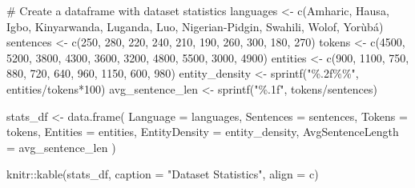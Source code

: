 \documentclass[
]{article}
\newenvironment{Shaded}{\begin{snugshade}}{\end{snugshade}}
\newcommand{\AttributeTok}[1]{\textcolor[rgb]{0.40,0.45,0.13}{#1}}
\newcommand{\CommentTok}[1]{\textcolor[rgb]{0.37,0.37,0.37}{#1}}
\newcommand{\DecValTok}[1]{\textcolor[rgb]{0.68,0.00,0.00}{#1}}
\newcommand{\FunctionTok}[1]{\textcolor[rgb]{0.28,0.35,0.67}{#1}}
\newcommand{\NormalTok}[1]{\textcolor[rgb]{0.00,0.23,0.31}{#1}}
\newcommand{\OtherTok}[1]{\textcolor[rgb]{0.00,0.23,0.31}{#1}}
\newcommand{\SpecialCharTok}[1]{\textcolor[rgb]{0.37,0.37,0.37}{#1}}
\newcommand{\StringTok}[1]{\textcolor[rgb]{0.13,0.47,0.30}{#1}}
\begin{document}
\begin{Shaded}
\begin{Highlighting}[]
\CommentTok{\# Create a dataframe with dataset statistics}
\NormalTok{languages }\OtherTok{\textless{}{-}} \FunctionTok{c}\NormalTok{(}\StringTok{\textquotesingle{}Amharic\textquotesingle{}}\NormalTok{, }\StringTok{\textquotesingle{}Hausa\textquotesingle{}}\NormalTok{, }\StringTok{\textquotesingle{}Igbo\textquotesingle{}}\NormalTok{, }\StringTok{\textquotesingle{}Kinyarwanda\textquotesingle{}}\NormalTok{, }\StringTok{\textquotesingle{}Luganda\textquotesingle{}}\NormalTok{, }\StringTok{\textquotesingle{}Luo\textquotesingle{}}\NormalTok{, }
               \StringTok{\textquotesingle{}Nigerian{-}Pidgin\textquotesingle{}}\NormalTok{, }\StringTok{\textquotesingle{}Swahili\textquotesingle{}}\NormalTok{, }\StringTok{\textquotesingle{}Wolof\textquotesingle{}}\NormalTok{, }\StringTok{\textquotesingle{}Yorùbá\textquotesingle{}}\NormalTok{)}
\NormalTok{sentences }\OtherTok{\textless{}{-}} \FunctionTok{c}\NormalTok{(}\DecValTok{250}\NormalTok{, }\DecValTok{280}\NormalTok{, }\DecValTok{220}\NormalTok{, }\DecValTok{240}\NormalTok{, }\DecValTok{210}\NormalTok{, }\DecValTok{190}\NormalTok{, }\DecValTok{260}\NormalTok{, }\DecValTok{300}\NormalTok{, }\DecValTok{180}\NormalTok{, }\DecValTok{270}\NormalTok{)}
\NormalTok{tokens }\OtherTok{\textless{}{-}} \FunctionTok{c}\NormalTok{(}\DecValTok{4500}\NormalTok{, }\DecValTok{5200}\NormalTok{, }\DecValTok{3800}\NormalTok{, }\DecValTok{4300}\NormalTok{, }\DecValTok{3600}\NormalTok{, }\DecValTok{3200}\NormalTok{, }\DecValTok{4800}\NormalTok{, }\DecValTok{5500}\NormalTok{, }\DecValTok{3000}\NormalTok{, }\DecValTok{4900}\NormalTok{)}
\NormalTok{entities }\OtherTok{\textless{}{-}} \FunctionTok{c}\NormalTok{(}\DecValTok{900}\NormalTok{, }\DecValTok{1100}\NormalTok{, }\DecValTok{750}\NormalTok{, }\DecValTok{880}\NormalTok{, }\DecValTok{720}\NormalTok{, }\DecValTok{640}\NormalTok{, }\DecValTok{960}\NormalTok{, }\DecValTok{1150}\NormalTok{, }\DecValTok{600}\NormalTok{, }\DecValTok{980}\NormalTok{)}
\NormalTok{entity\_density }\OtherTok{\textless{}{-}} \FunctionTok{sprintf}\NormalTok{(}\StringTok{"\%.2f\%\%"}\NormalTok{, entities}\SpecialCharTok{/}\NormalTok{tokens}\SpecialCharTok{*}\DecValTok{100}\NormalTok{)}
\NormalTok{avg\_sentence\_len }\OtherTok{\textless{}{-}} \FunctionTok{sprintf}\NormalTok{(}\StringTok{"\%.1f"}\NormalTok{, tokens}\SpecialCharTok{/}\NormalTok{sentences)}

\NormalTok{stats\_df }\OtherTok{\textless{}{-}} \FunctionTok{data.frame}\NormalTok{(}
  \AttributeTok{Language =}\NormalTok{ languages,}
  \AttributeTok{Sentences =}\NormalTok{ sentences,}
  \AttributeTok{Tokens =}\NormalTok{ tokens,}
  \AttributeTok{Entities =}\NormalTok{ entities,}
  \AttributeTok{EntityDensity =}\NormalTok{ entity\_density,}
  \AttributeTok{AvgSentenceLength =}\NormalTok{ avg\_sentence\_len}
\NormalTok{)}

\NormalTok{knitr}\SpecialCharTok{::}\FunctionTok{kable}\NormalTok{(stats\_df, }\AttributeTok{caption =} \StringTok{"Dataset Statistics"}\NormalTok{, }\AttributeTok{align =} \StringTok{\textquotesingle{}c\textquotesingle{}}\NormalTok{)}
\end{Highlighting}
\end{Shaded}
\end{document}
